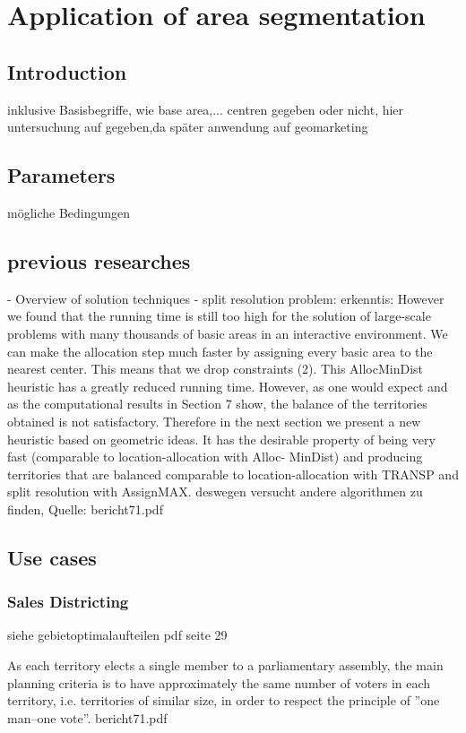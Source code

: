 \section{Application of area segmentation}

\subsection{Introduction}

inklusive Basisbegriffe, wie base area,...
centren gegeben oder nicht, hier untersuchung auf gegeben,da später anwendung auf geomarketing
\subsection{Parameters}
mögliche Bedingungen
\subsection{previous researches}
- Overview of solution techniques
- split resolution problem: erkenntis: However we found that the running time is still too high for the solution of large-scale problems with many thousands of basic areas in an interactive environment. We can make the allocation step much faster by assigning every basic area to the nearest center. This means that we drop constraints (2). This AllocMinDist heuristic has a greatly reduced running time. However, as one would expect and as the computational results in
Section 7 show, the balance of the territories obtained is not satisfactory. Therefore in the next section we present a new heuristic based on geometric ideas. It
has the desirable property of being very fast (comparable to location-allocation with Alloc-
MinDist) and producing territories that are balanced comparable to location-allocation with
TRANSP and split resolution with AssignMAX. deswegen versucht andere algorithmen zu finden, Quelle: bericht71.pdf



\subsection{Use cases}

\subsubsection{Sales Districting}

siehe gebietoptimalaufteilen pdf seite 29

As each territory elects a single member to a parliamentary assembly, the main
planning criteria is to have approximately the same number of voters in each territory, i.e.
territories of similar size, in order to respect the principle of ”one man–one vote”. bericht71.pdf

